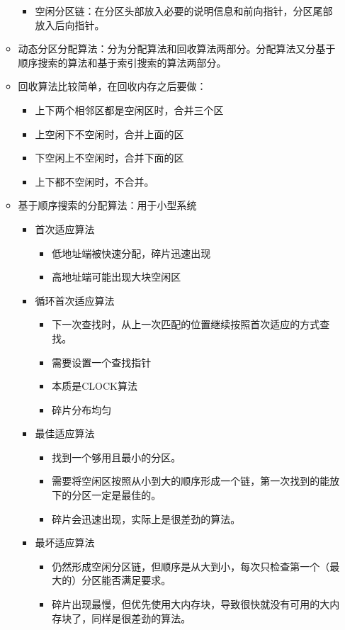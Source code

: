 \documentclass[12pt, a4paper, oneside]{ctexart}
\begin{document}
\begin{enumerate}
\begin{itemize}
\begin{itemize}
      \item 空闲分区链：在分区头部放入必要的说明信息和前向指针，分区尾部放入后向指针。
    \end{itemize}
    \item 动态分区分配算法：分为分配算法和回收算法两部分。分配算法又分基于顺序搜索的算法和基于索引搜索的算法两部分。
    \item 回收算法比较简单，在回收内存之后要做：
    \begin{itemize}
      \item 上下两个相邻区都是空闲区时，合并三个区
      \item 上空闲下不空闲时，合并上面的区
      \item 下空闲上不空闲时，合并下面的区
      \item 上下都不空闲时，不合并。
    \end{itemize}
    \item 基于顺序搜索的分配算法：用于小型系统
    \begin{itemize}
      \item 首次适应算法
      \begin{itemize}
        \item 低地址端被快速分配，碎片迅速出现
        \item 高地址端可能出现大块空闲区
      \end{itemize}
      \item 循环首次适应算法
      \begin{itemize}
        \item 下一次查找时，从上一次匹配的位置继续按照首次适应的方式查找。
        \item 需要设置一个查找指针
        \item 本质是CLOCK算法
        \item 碎片分布均匀
      \end{itemize}
      \item 最佳适应算法
      \begin{itemize}
        \item 找到一个够用且最小的分区。
        \item 需要将空闲区按照从小到大的顺序形成一个链，第一次找到的能放下的分区一定是最佳的。
        \item 碎片会迅速出现，实际上是很差劲的算法。
      \end{itemize}
      \item 最坏适应算法
      \begin{itemize}
        \item 仍然形成空闲分区链，但顺序是从大到小，每次只检查第一个（最大的）分区能否满足要求。
        \item 碎片出现最慢，但优先使用大内存块，导致很快就没有可用的大内存块了，同样是很差劲的算法。
      \end{itemize}
    \end{itemize}


\end{itemize}
\end{enumerate}
\end{document}
